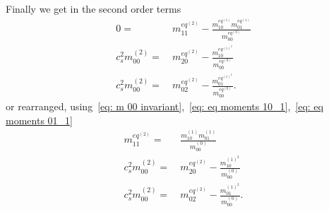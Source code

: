 Finally we get in the second order terms
\begin{align}
    \label{eq: eq moments 11_2}
    0 =&\ m_{11}^{eq^{(2)}} - \frac{ m_{10}^{eq^{(1)}}m_{01}^{eq^{(1)}}}{m_{00}^{eq^{(0)}}}
    \\
    \label{eq: eq moments 20_2}
    c_s^2 m_{00}^{(2)} =&\ m_{20}^{eq^{(2)}} - \frac{ m_{10}^{eq^{{(1)}^2}}}{m_{00}^{eq^{(0)}}}
    \\
    \label{eq: eq moments 02_2}
    c_s^2 m_{00}^{(2)} =&\ m_{02}^{eq^{(2)}} - \frac{ m_{01}^{eq^{{(1)}^2}}}{m_{00}^{eq^{(0)}}} .
\end{align}
or rearranged, using~\eqref{eq: m 00 invariant},~\eqref{eq: eq moments 10_1},~\eqref{eq: eq moments 01_1}
\begin{align}
    m_{11}^{eq^{(2)}} =&\  \frac{ m_{10}^{(1)}m_{01}^{(1)}}{m_{00}^{(0)}}
    \\
    c_s^2 m_{00}^{(2)} =&\ m_{20}^{eq^{(2)}} - \frac{ m_{10}^{{(1)}^2}}{m_{00}^{(0)}}
    \\
    c_s^2 m_{00}^{(2)} =&\ m_{02}^{eq^{(2)}} - \frac{ m_{01}^{{(1)}^2}}{m_{00}^{(0)}} .
\end{align}
